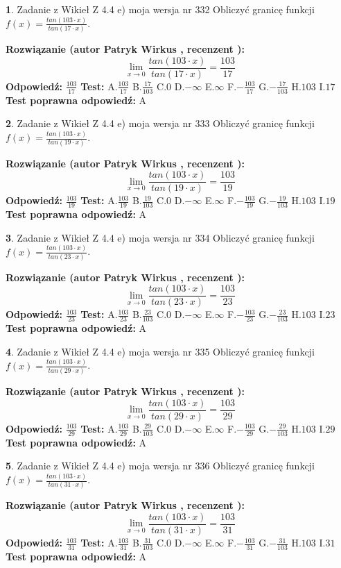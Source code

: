 \documentclass[12pt, a4paper]{article}
\theoremstyle{definition} %
\newtheorem{zad}{}
\newcommand{\zadStart}[1]{\begin{zad}#1\newline}
\newcommand{\zadStop}{\end{zad}}
\newcommand{\rozwStart}[2]{\noindent \textbf{Rozwiązanie (autor #1 , recenzent #2): }\newline}
\newcommand{\rozwStop}{\newline}
\newcommand{\odpStart}{\noindent \textbf{Odpowiedź:}\newline}
\newcommand{\odpStop}{\newline}
\newcommand{\testStart}{\noindent \textbf{Test:}\newline}
\newcommand{\testStop}{\newline}
\newcommand{\kluczStart}{\noindent \textbf{Test poprawna odpowiedź:}\newline}
\newcommand{\kluczStop}{\newline}
\begin{document}
\zadStart{Zadanie z Wikieł Z 4.4 e) moja wersja nr 332}
Obliczyć granicę funkcji $f(x)=\frac{tan(103\cdot x)}{tan(17\cdot x)}$.
\zadStop
\rozwStart{Patryk Wirkus}{}
$$\lim\limits_{x\to 0}\frac{tan(103\cdot x)}{tan(17\cdot x)}=
\frac{103}{17}$$
\rozwStop
\odpStart
$\frac{103}{17}$
\odpStop
\testStart
A.$\frac{103}{17}$
B.$\frac{17}{103}$
C.$0$
D.$-\infty$
E.$\infty$
F.$-\frac{103}{17}$
G.$-\frac{17}{103}$
H.$103$
I.$17$
\testStop
\kluczStart
A
\kluczStop



\zadStart{Zadanie z Wikieł Z 4.4 e) moja wersja nr 333}
Obliczyć granicę funkcji $f(x)=\frac{tan(103\cdot x)}{tan(19\cdot x)}$.
\zadStop
\rozwStart{Patryk Wirkus}{}
$$\lim\limits_{x\to 0}\frac{tan(103\cdot x)}{tan(19\cdot x)}=
\frac{103}{19}$$
\rozwStop
\odpStart
$\frac{103}{19}$
\odpStop
\testStart
A.$\frac{103}{19}$
B.$\frac{19}{103}$
C.$0$
D.$-\infty$
E.$\infty$
F.$-\frac{103}{19}$
G.$-\frac{19}{103}$
H.$103$
I.$19$
\testStop
\kluczStart
A
\kluczStop



\zadStart{Zadanie z Wikieł Z 4.4 e) moja wersja nr 334}
Obliczyć granicę funkcji $f(x)=\frac{tan(103\cdot x)}{tan(23\cdot x)}$.
\zadStop
\rozwStart{Patryk Wirkus}{}
$$\lim\limits_{x\to 0}\frac{tan(103\cdot x)}{tan(23\cdot x)}=
\frac{103}{23}$$
\rozwStop
\odpStart
$\frac{103}{23}$
\odpStop
\testStart
A.$\frac{103}{23}$
B.$\frac{23}{103}$
C.$0$
D.$-\infty$
E.$\infty$
F.$-\frac{103}{23}$
G.$-\frac{23}{103}$
H.$103$
I.$23$
\testStop
\kluczStart
A
\kluczStop



\zadStart{Zadanie z Wikieł Z 4.4 e) moja wersja nr 335}
Obliczyć granicę funkcji $f(x)=\frac{tan(103\cdot x)}{tan(29\cdot x)}$.
\zadStop
\rozwStart{Patryk Wirkus}{}
$$\lim\limits_{x\to 0}\frac{tan(103\cdot x)}{tan(29\cdot x)}=
\frac{103}{29}$$
\rozwStop
\odpStart
$\frac{103}{29}$
\odpStop
\testStart
A.$\frac{103}{29}$
B.$\frac{29}{103}$
C.$0$
D.$-\infty$
E.$\infty$
F.$-\frac{103}{29}$
G.$-\frac{29}{103}$
H.$103$
I.$29$
\testStop
\kluczStart
A
\kluczStop



\zadStart{Zadanie z Wikieł Z 4.4 e) moja wersja nr 336}
Obliczyć granicę funkcji $f(x)=\frac{tan(103\cdot x)}{tan(31\cdot x)}$.
\zadStop
\rozwStart{Patryk Wirkus}{}
$$\lim\limits_{x\to 0}\frac{tan(103\cdot x)}{tan(31\cdot x)}=
\frac{103}{31}$$
\rozwStop
\odpStart
$\frac{103}{31}$
\odpStop
\testStart
A.$\frac{103}{31}$
B.$\frac{31}{103}$
C.$0$
D.$-\infty$
E.$\infty$
F.$-\frac{103}{31}$
G.$-\frac{31}{103}$
H.$103$
I.$31$
\testStop
\kluczStart
A
\kluczStop
\end{document}
